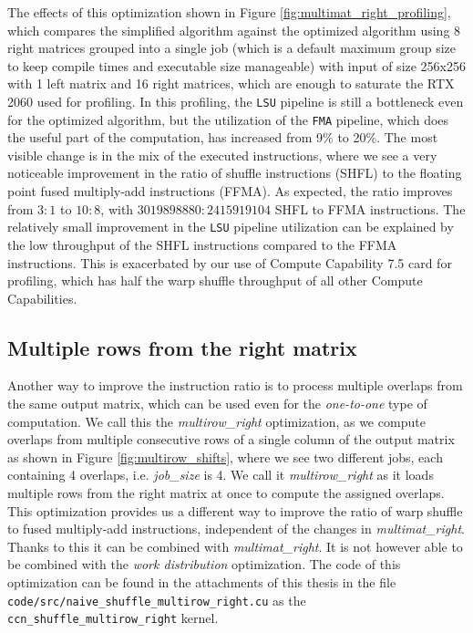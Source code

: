 The effects of this optimization shown in Figure \ref{fig:multimat_right_profiling}, which compares the simplified algorithm against the optimized algorithm using 8 right matrices grouped into a single job (which is a default maximum group size to keep compile times and executable size manageable) with input of size 256x256 with 1 left matrix and 16 right matrices, which are enough to saturate the RTX 2060 used for profiling. In this profiling, the \texttt{LSU} pipeline is still a bottleneck even for the optimized algorithm, but the utilization of the \texttt{FMA} pipeline, which does the useful part of the computation, has increased from 9\% to 20\%. The most visible change is in the mix of the executed instructions, where we see a very noticeable improvement in the ratio of shuffle instructions (SHFL) to the floating point fused multiply-add instructions (FFMA). As expected, the ratio improves from $3 : 1$ to $10 : 8$, with $3 019 898 880 : 2 415 919 104$ SHFL to FFMA instructions. The relatively small improvement in the \texttt{LSU} pipeline utilization can be explained by the low throughput of the SHFL instructions compared to the FFMA instructions. This is exacerbated by our use of Compute Capability 7.5 card for profiling, which has half the warp shuffle throughput of all other Compute Capabilities.

\subsection{Multiple rows from the right matrix}
\label{sec:multirow_right}

Another way to improve the instruction ratio is to process multiple overlaps from the same output matrix, which can be used even for the \textit{one-to-one} type of computation. We call this the \textit{multirow\_right} optimization, as we compute overlaps from multiple consecutive rows of a single column of the output matrix as shown in Figure \ref{fig:multirow_shifts}, where we see two different jobs, each containing 4 overlaps, i.e. \textit{job\_size} is 4. We call it \textit{multirow\_right} as it loads multiple rows from the right matrix at once to compute the assigned overlaps. This optimization provides us a different way to improve the ratio of warp shuffle to fused multiply-add instructions, independent of the changes in \textit{multimat\_right}. Thanks to this it can be combined with \textit{multimat\_right}. It is not however able to be combined with the \textit{work distribution} optimization. The code of this optimization can be found in the attachments of this thesis in the file \texttt{code/src/naive\_shuffle\_multirow\_right.cu} as the \texttt{ccn\_shuffle\_multirow\_right} kernel. 


